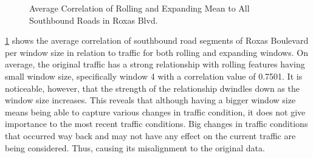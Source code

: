 \begin{figure}[h] 
\centering
  \centering
  \caption{Average Correlation of Rolling and Expanding Mean to All Southbound Roads in Roxas Blvd.}
  \label{heatmap_roxas}
\end{figure}

\ref{heatmap_roxas} shows the average correlation of southbound road segments of Roxas Boulevard per window size in relation to traffic for both rolling and expanding windows. On average, the original traffic has a strong relationship with rolling features having small window size, specifically window 4 with a correlation value of 0.7501. It is noticeable, however, that the strength of the relationship dwindles down as the window size increases. This reveals that although having a bigger window size means being able to capture various changes in traffic condition, it does not give importance to the most recent traffic conditions. Big changes in traffic conditions that occurred way back and may not have any effect on the current traffic are being considered. Thus, causing its misalignment to the original data. 


